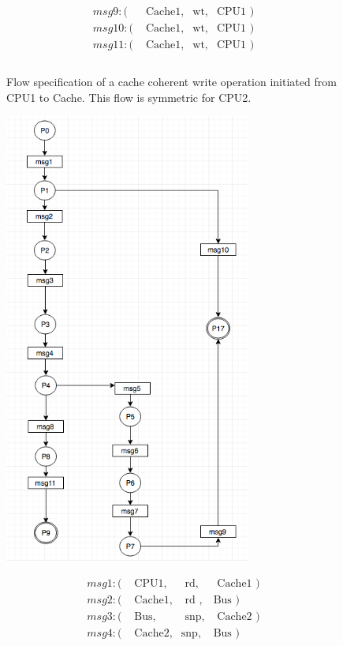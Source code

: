 \documentclass[12pt,frontmatter,copyright,thesis]{usfmanus}
\begin{document}
\begin{appendix}
\begin{figure}[h]
\begin{minipage}{.5\textwidth}
{\[\begin{array}{llll}
 msg9: (&\mbox{ Cache1},&\mbox{wt},&\mbox{CPU1       })\\
 msg10: (&\mbox{ Cache1},&\mbox{wt},&\mbox{CPU1       })\\
 msg11: (&\mbox{ Cache1},&\mbox{wt},&\mbox{CPU1       })\\\\
 \end{array}
 \]}
 \end{minipage}
 \caption{\footnotesize Flow specification of a cache coherent write operation initiated from CPU1 to Cache. \footnotesize This flow is symmetric for CPU2. }
 \label{wtprotocol}
 \end{figure}
\begin{figure}[h]
 \centerline{
 \includegraphics[width=3.2in]{rw}}
\begin{minipage}{.5\textwidth}
 {\footnotesize
 \[
 \begin{array}{llll}
 msg1: (&\mbox{ CPU1},&\mbox{ rd},&\mbox{ Cache1 })\\
 msg2: (&\mbox{ Cache1},&\mbox{ rd },&\mbox{Bus })\\     
 msg3: (&\mbox{ Bus},&\mbox{ snp},&\mbox{ Cache2     })\\
 msg4: (&\mbox{ Cache2},&\mbox{snp},&\mbox{Bus })\\

\end{array}\]}
\end{minipage}
\end{figure}
\end{appendix}
\end{document}

